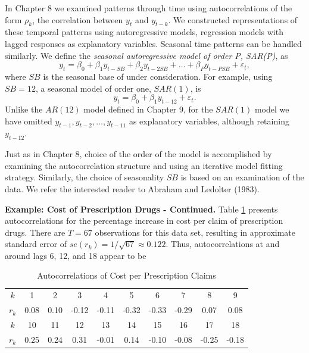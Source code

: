 In Chapter 8 we examined patterns through time using
autocorrelations of the form $\rho_{k}$, the correlation between
$y_t$ and $y_{t-k}$. We constructed representations of these
temporal patterns using autoregressive models, regression models
with lagged responses as explanatory variables. Seasonal time
patterns can be handled similarly. We define the \emph{seasonal
autoregressive model of order P, SAR(P)}, as
\begin{equation}\label{E9:SAR(P)}
y_t=\beta_0+\beta_1y_{t-SB}+\beta_2y_{t-2SB}+\ldots+\beta
_{P}y_{t-PSB}+\varepsilon_t,
\end{equation}
where $SB$ is the seasonal base of under consideration. For example,
using $ SB=12$, a seasonal model of order one, $SAR(1)$, is
\begin{equation*}
y_t=\beta_0+\beta_1y_{t-12}+\varepsilon_t.
\end{equation*}
Unlike the $AR(12)$ model defined in Chapter 9, for the $SAR(1)$
model we have omitted $y_{t-1},y_{t-2},\ldots,y_{t-11}$ as
explanatory variables, although retaining $y_{t-12}$.

Just as in Chapter 8, choice of the order of the model is accomplished by
examining the autocorrelation structure and using an iterative model fitting
strategy. Similarly, the choice of seasonality $SB$ is based on an
examination of the data. We refer the interested reader to Abraham and
Ledolter (1983).

\linejed{}

\textbf{Example: Cost of Prescription Drugs - Continued.} Table
\ref{T9:PrescAutoCorr} presents autocorrelations for the percentage
increase in cost per claim of prescription drugs. There are $T=67$
observations for this data set, resulting in approximate standard
error of $se(r_{k})=1/\sqrt{67}\approx 0.122$. Thus,
autocorrelations at and around lags 6, 12, and 18 appear to be

\begin{table}[h]
 \caption{\label{T9:PrescAutoCorr} Autocorrelations
of Cost per Prescription Claims}
\begin{center}
\begin{tabular}{c|ccccccccc}
\hline
$k$ & 1 & 2 & 3 & 4 & 5 & 6 & 7 & 8 & 9 \\
$r_{k}$ & 0.08 & 0.10 & -0.12 & -0.11 & -0.32 & -0.33 & -0.29 & 0.07 & 0.08
\\ \hline
$k$ & 10 & 11 & 12 & 13 & 14 & 15 & 16 & 17 & 18 \\
$r_{k}$ & 0.25 & 0.24 & 0.31 & -0.01 & 0.14 & -0.10 & -0.08 & -0.25 & -0.18
\\ \hline
\end{tabular}\end{center}
 \end{table}

